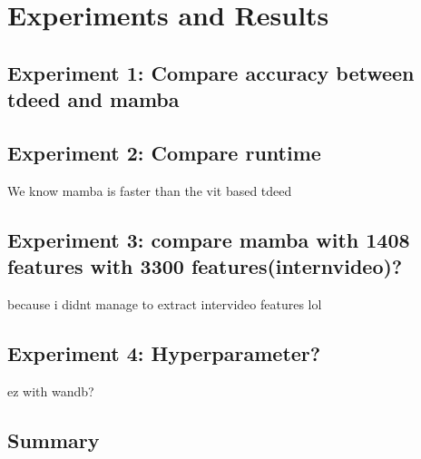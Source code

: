 \chapter{Experiments and Results}
\label{chap:experiments}

\section{Experiment 1: Compare accuracy between tdeed and mamba}
\section{Experiment 2: Compare runtime}
We know mamba is faster than the vit based tdeed
\section{Experiment 3: compare mamba with 1408 features with 3300 features(internvideo)?}
because i didnt manage to extract intervideo features lol
\section{Experiment 4: Hyperparameter?}
ez with wandb?
\section{Summary}